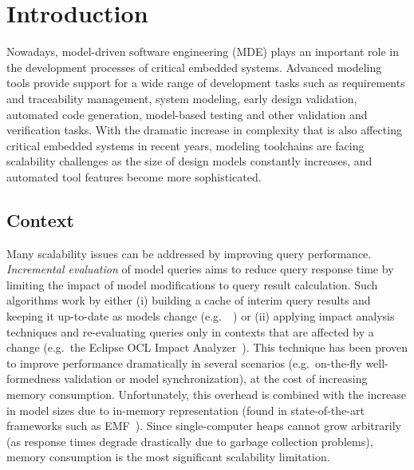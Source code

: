 \chapter{Introduction}
\label{chap:introduction}


Nowadays, model-driven software engineering (MDE) plays an important role in the development processes of critical embedded systems. Advanced modeling tools provide support for a wide range of development tasks such as requirements and traceability management, system modeling, early design validation, automated code generation, model-based testing and other validation and verification tasks. 
With the dramatic increase in complexity that is also affecting critical embedded systems in recent years, modeling toolchains are facing scalability challenges as the size of design models constantly increases, and automated tool features become more sophisticated.

\section{Context}

Many scalability issues can be addressed by improving query performance. \emph{Incremental evaluation} of model queries aims to reduce query response time by limiting the impact of model modifications to query result calculation. Such algorithms work by either (i) building a cache of interim query results and keeping it up-to-date as models change (e.g.\ \eiq{}~\cite{models10}) or (ii) applying impact analysis techniques and re-evaluating queries only in contexts that are affected by a change (e.g.\ the Eclipse OCL Impact Analyzer~\cite{OCLIA}). This technique has been proven to improve performance dramatically in several scenarios (e.g.\ on-the-fly well-formedness validation or model synchronization), at the cost of increasing memory consumption. Unfortunately, this overhead is combined with the increase in model sizes due to in-memory representation (found in state-of-the-art frameworks such as EMF~\cite{EMF}). Since single-computer heaps cannot grow arbitrarily (as response times degrade drastically due to garbage collection problems), memory consumption is the most significant scalability limitation.%



